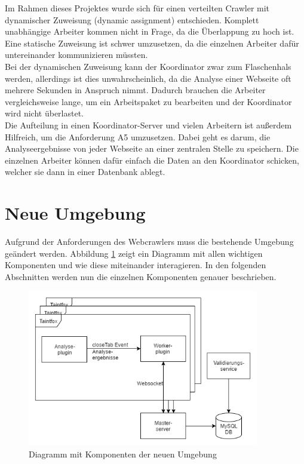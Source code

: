 Im Rahmen dieses Projektes wurde sich für einen verteilten Crawler mit dynamischer Zuweisung (dynamic assignment) entschieden. Komplett unabhängige Arbeiter kommen nicht in Frage, da die Überlappung zu hoch ist. Eine statische Zuweisung ist schwer umzusetzen, da die einzelnen Arbeiter dafür untereinander kommunizieren müssten. \\
Bei der dynamischen Zuweisung kann der Koordinator zwar zum Flaschenhals werden, allerdings ist dies unwahrscheinlich, da die Analyse einer Webseite oft mehrere Sekunden in Anspruch nimmt. Dadurch brauchen die Arbeiter vergleichsweise lange, um ein Arbeitspaket zu bearbeiten und der Koordinator wird nicht überlastet. \\
Die Aufteilung in einen Koordinator-Server und vielen Arbeitern ist außerdem Hilfreich, um die Anforderung A5 umzusetzen. Dabei geht es darum, die Analyseergebnisse von jeder Webseite an einer zentralen Stelle zu speichern. Die einzelnen Arbeiter können dafür einfach die Daten an den Koordinator schicken, welcher sie dann in einer Datenbank ablegt.


\section{Neue Umgebung}
Aufgrund der Anforderungen des Webcrawlers muss die bestehende Umgebung geändert werden. Abbildung \ref{fig:NeueUmgebung} zeigt ein Diagramm mit allen wichtigen Komponenten und wie diese miteinander interagieren. In den folgenden Abschnitten werden nun die einzelnen Komponenten genauer beschrieben.

\begin{figure}
	\centering
	\includegraphics[width=0.9\textwidth]{Bilder/NeueUmgebung.png}
	\caption{Diagramm mit Komponenten der neuen Umgebung}
	\label{fig:NeueUmgebung}
\end{figure}

